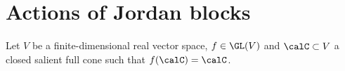 \section{Actions of Jordan blocks}

Let \(V\) be a finite-dimensional real vector space, \(f \in \GL(V)\) and \(\calC \subset V\) a closed salient full cone such that \(f(\calC) = \calC\). 



